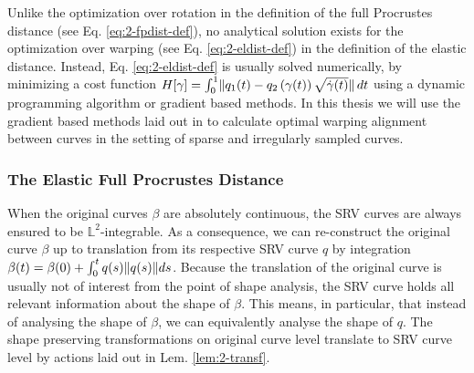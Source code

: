 \noindent Unlike the optimization over rotation in the definition of the full Procrustes distance (see Eq. \ref{eq:2-fpdist-def}), no analytical solution exists for the optimization over warping (see Eq. \ref{eq:2-eldist-def}) in the definition of the elastic distance.
Instead, Eq. \ref{eq:2-eldist-def} is usually solved numerically, by minimizing a cost function $H[\gamma] = \int_0^1 \lVert q_1(t) - q_2\left( \gamma(t) \right) \sqrt{\dot\gamma(t)}\rVert\, dt$ using a dynamic programming algorithm \parencite[see e.g.][152]{SrivastavaKlassen2016} or gradient based methods.
In this thesis we will use the gradient based methods laid out in \cite{Steyer2021} to calculate optimal warping alignment between curves in the setting of sparse and irregularly sampled curves.



\subsubsection*{The Elastic Full Procrustes Distance}
When the original curves $\beta$ are absolutely continuous, the SRV curves are always ensured to be $\mathbb{L}^2$-integrable.
As a consequence, we can re-construct the original curve $\beta$ up to translation from its respective SRV curve $q$ by integration $\beta(t) = \beta(0) + \int_0^t q(s) \lVert q(s)\rVert ds$.
Because the translation of the original curve is usually not of interest from the point of shape analysis, the SRV curve holds all relevant information about the shape of $\beta$.
This means, in particular, that instead of analysing the shape of $\beta$, we can equivalently analyse the shape of $q$.
The shape preserving transformations on original curve level translate to SRV curve level by actions laid out in Lem. \ref{lem:2-transf}.

